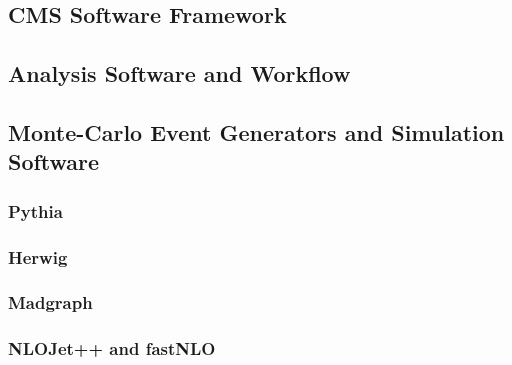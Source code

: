 

\subsection{CMS Software Framework}
\subsection{Analysis Software and Workflow}
\subsection{Monte-Carlo Event Generators and Simulation Software}
\label{subsection:mc_generators}

\subsubsection{Pythia}
\subsubsection{Herwig}
\subsubsection{Madgraph}
\subsubsection{NLOJet++ and fastNLO}


